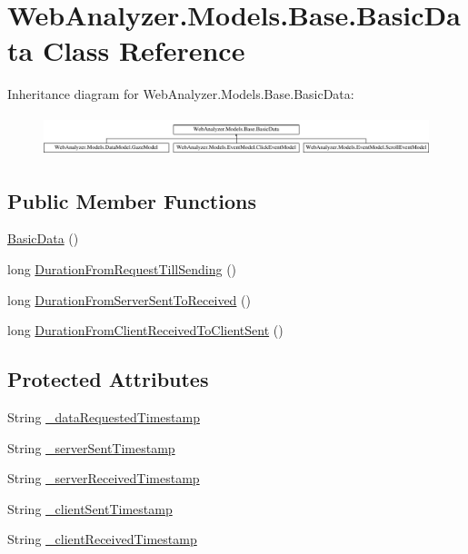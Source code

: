 \hypertarget{class_web_analyzer_1_1_models_1_1_base_1_1_basic_data}{}\section{Web\+Analyzer.\+Models.\+Base.\+Basic\+Data Class Reference}
\label{class_web_analyzer_1_1_models_1_1_base_1_1_basic_data}
Inheritance diagram for Web\+Analyzer.\+Models.\+Base.\+Basic\+Data\+:\begin{figure}[H]
\begin{center}
\leavevmode
\includegraphics[height=1.181435cm]{class_web_analyzer_1_1_models_1_1_base_1_1_basic_data}
\end{center}
\end{figure}
\subsection*{Public Member Functions}
\begin{DoxyCompactItemize}
\item 
\hyperlink{class_web_analyzer_1_1_models_1_1_base_1_1_basic_data_a2c930c0d9a1da4147a2845a595fa25f0}{Basic\+Data} ()
\item 
long \hyperlink{class_web_analyzer_1_1_models_1_1_base_1_1_basic_data_abfc630907e2b10eee7bae486ae2f21a4}{Duration\+From\+Request\+Till\+Sending} ()
\item 
long \hyperlink{class_web_analyzer_1_1_models_1_1_base_1_1_basic_data_a441d5a37fec9147bb16831aae4d957e2}{Duration\+From\+Server\+Sent\+To\+Received} ()
\item 
long \hyperlink{class_web_analyzer_1_1_models_1_1_base_1_1_basic_data_a438bf9b94d6048ed88a268f0497f4ee0}{Duration\+From\+Client\+Received\+To\+Client\+Sent} ()
\end{DoxyCompactItemize}
\subsection*{Protected Attributes}
\begin{DoxyCompactItemize}
\item 
String \hyperlink{class_web_analyzer_1_1_models_1_1_base_1_1_basic_data_aa600b76f390c856cbe15c8ba6bd7ccf8}{\+\_\+data\+Requested\+Timestamp}
\item 
String \hyperlink{class_web_analyzer_1_1_models_1_1_base_1_1_basic_data_adc90ecba185e25a316a86a03f354f4ff}{\+\_\+server\+Sent\+Timestamp}
\item 
String \hyperlink{class_web_analyzer_1_1_models_1_1_base_1_1_basic_data_aa7dac12776bc5b2bbde67ba075b2fe00}{\+\_\+server\+Received\+Timestamp}
\item 
String \hyperlink{class_web_analyzer_1_1_models_1_1_base_1_1_basic_data_af7624b281535382cf49d15dd9faddf47}{\+\_\+client\+Sent\+Timestamp}
\item 
String \hyperlink{class_web_analyzer_1_1_models_1_1_base_1_1_basic_data_a9bbe1d03f8e822eb5c6ff47cea03c46e}{\+\_\+client\+Received\+Timestamp}
\end{DoxyCompactItemize}
